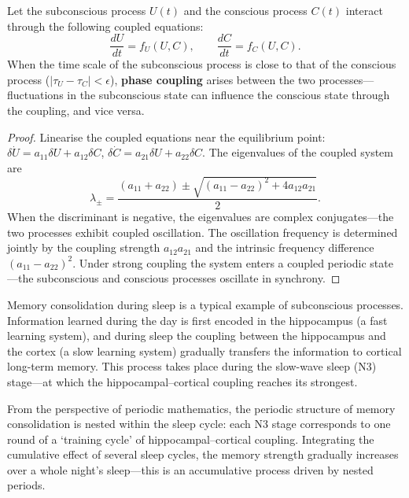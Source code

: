 \begin{proposition}\label{prop:subconscious_conscious_coupling}
Let the subconscious process $U(t)$ and the conscious process $C(t)$ interact through the following coupled equations:
\[
\frac{dU}{dt} = f_U(U, C), \qquad \frac{dC}{dt} = f_C(U, C).
\]
When the time scale of the subconscious process is close to that of the conscious process ($|\tau_U - \tau_C| < \epsilon$), \textbf{phase coupling} arises between the two processes---fluctuations in the subconscious state can influence the conscious state through the coupling, and vice versa.
\end{proposition}

\begin{proof}
Linearise the coupled equations near the equilibrium point: $\delta \dot U = a_{11}\delta U + a_{12}\delta C$, $\delta \dot C = a_{21}\delta U + a_{22}\delta C$. The eigenvalues of the coupled system are
\[
\lambda_{\pm} = \frac{(a_{11}+a_{22}) \pm \sqrt{(a_{11}-a_{22})^2 + 4 a_{12} a_{21}}}{2}.
\]
When the discriminant is negative, the eigenvalues are complex conjugates---the two processes exhibit coupled oscillation. The oscillation frequency is determined jointly by the coupling strength $a_{12}a_{21}$ and the intrinsic frequency difference $(a_{11}-a_{22})^2$. Under strong coupling the system enters a coupled periodic state---the subconscious and conscious processes oscillate in synchrony.
\end{proof}

\begin{example}\label{ex:sleep_memory_consolidation}
Memory consolidation during sleep is a typical example of subconscious processes. Information learned during the day is first encoded in the hippocampus (a fast learning system), and during sleep the coupling between the hippocampus and the cortex (a slow learning system) gradually transfers the information to cortical long-term memory. This process takes place during the slow-wave sleep (N3) stage---at which the hippocampal--cortical coupling reaches its strongest.

From the perspective of periodic mathematics, the periodic structure of memory consolidation is nested within the sleep cycle: each N3 stage corresponds to one round of a `training cycle' of hippocampal--cortical coupling. Integrating the cumulative effect of several sleep cycles, the memory strength gradually increases over a whole night's sleep---this is an accumulative process driven by nested periods.
\end{example}

